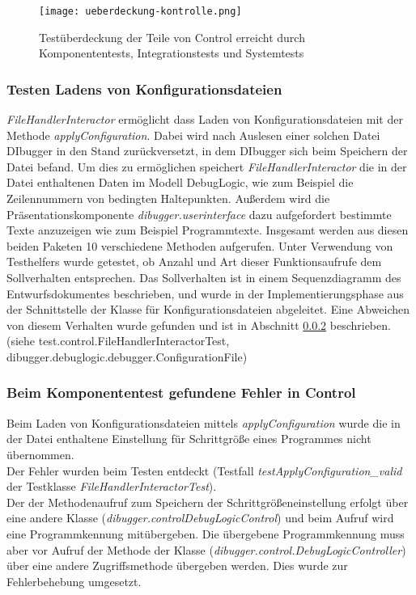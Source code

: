 \documentclass[parskip=full]{scrartcl}
\begin{document}
\begin{figure}[!h]
    \centering
    \texttt{[image: ueberdeckung-kontrolle.png]}
    \caption{Testüberdeckung der Teile von Control erreicht durch \glspl{Komponententest}, Integrationstests und Systemtests}\label{AbdeckungImInterpreter}
\end{figure}

\subsubsection{Testen Ladens von Konfigurationsdateien}
\textit{FileHandlerInteractor} ermöglicht dass Laden von Konfigurationsdateien mit der Methode \textit{applyConfiguration}.
Dabei wird nach Auslesen einer solchen Datei DIbugger in den Stand zurückversetzt, in dem DIbugger sich beim Speichern der Datei befand.
Um dies zu ermöglichen speichert \textit{FileHandlerInteractor} die in der Datei enthaltenen Daten im Modell DebugLogic, wie zum Beispiel die Zeilennummern von bedingten Haltepunkten.
Außerdem wird die Präsentationskomponente \textit{dibugger.userinterface} dazu aufgefordert bestimmte Texte anzuzeigen wie zum Beispiel Programmtexte.
Insgesamt werden aus diesen beiden Paketen 10 verschiedene Methoden aufgerufen.
Unter Verwendung von \glspl{Testhelfer} wurde getestet, ob Anzahl und Art dieser Funktionsaufrufe dem Sollverhalten entsprechen.
Das Sollverhalten ist in einem Sequenzdiagramm des Entwurfsdokumentes beschrieben, und wurde in der Implementierungsphase aus der Schnittstelle der Klasse für Konfigurationsdateien abgeleitet.
Eine Abweichen von diesem Verhalten wurde gefunden und ist in Abschnitt \ref{fehlerInControl} beschrieben.\\
(siehe test.control.FileHandlerInteractorTest, dibugger.debuglogic.debugger.ConfigurationFile)

\subsubsection{Beim Komponententest gefundene Fehler in Control}\label{fehlerInControl}
Beim Laden von Konfigurationsdateien mittels \textit{applyConfiguration} wurde die in der Datei enthaltene Einstellung für Schrittgröße eines Programmes nicht übernommen.\\
Der Fehler wurden beim Testen entdeckt (Testfall \textit{testApplyConfiguration\_valid} der Testklasse \textit{FileHandlerInteractorTest}).\\
Der der Methodenaufruf zum Speichern der Schrittgrößeneinstellung erfolgt über eine andere Klasse (\textit{dibugger.controlDebugLogicControl}) und beim Aufruf wird eine Programmkennung mitübergeben.
Die übergebene Programmkennung muss aber vor Aufruf der Methode der Klasse (\textit{dibugger.control.DebugLogicController}) über eine andere Zugriffsmethode übergeben werden.
Dies wurde zur Fehlerbehebung umgesetzt.
\end{document}
